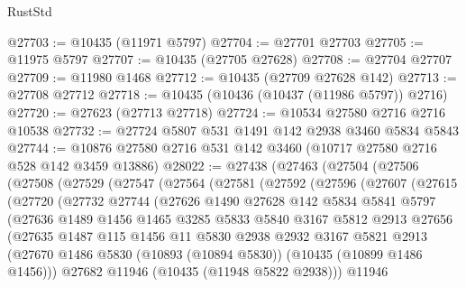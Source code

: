\begin{lexlean}{RustStd}
\begin{coremodule}
@27703 := @10435 (@11971 @5797)
@27704 := @27701 @27703
@27705 := @11975 @5797
@27707 := @10435 (@27705 @27628)
@27708 := @27704 @27707
@27709 := @11980 @1468
@27712 := @10435 (@27709 @27628 @142)
@27713 := @27708 @27712
@27718 := @10435 (@10436 (@10437 (@11986 @5797)) @2716)
@27720 := @27623 (@27713 @27718)
@27724 := @10534 @27580 @2716 @2716 @10538
@27732 := @27724 @5807 @531 @1491 @142 @2938 @3460 @5834 @5843
@27744 := @10876 @27580 @2716 @531 @142 @3460 (@10717 @27580 @2716 @528 @142 @3459 @13886)
@28022 := @27438
    (@27463
      (@27504
        (@27506
          (@27508
            (@27529
              (@27547
                (@27564
                  (@27581
                    (@27592
                      (@27596
                        (@27607
                          (@27615
                            (@27720
                              (@27732
                                @27744
                                (@27626
                                  @1490
                                  @27628
                                  @142
                                  @5834
                                  @5841
                                  @5797
                                  (@27636
                                    @1489
                                    @1456
                                    @1465
                                    @3285
                                    @5833
                                    @5840
                                    @3167
                                    @5812
                                    @2913
                                    @27656
                                    (@27635
                                      @1487
                                      @115
                                      @1456
                                      @11
                                      @5830
                                      @2938
                                      @2932
                                      @3167
                                      @5821
                                      @2913
                                      (@27670
                                        @1486
                                        @5830
                                        (@10893 (@10894 @5830))
                                        (@10435 (@10899 @1486 @1456)))
                                      @27682
                                      @11946
                                      (@10435 (@11948 @5822 @2938)))
                                    @11946

\end{coremodule}
\end{lexlean}
